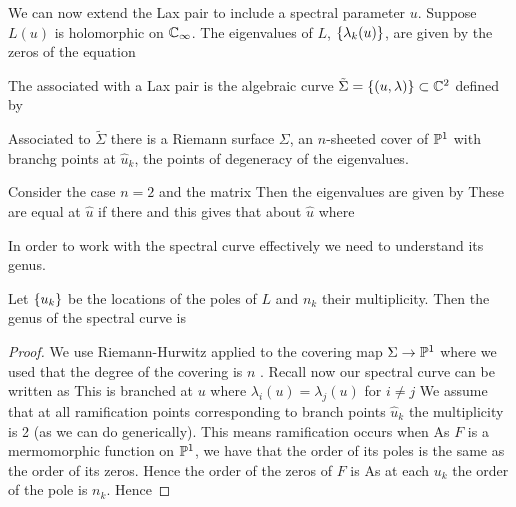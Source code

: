 \documentclass{article}
\begin{document}
We can now extend the Lax pair to include a spectral parameter $u$. Suppose $L(u)$ is holomorphic on $\mathbb{C}_\infty$. The eigenvalues of $L$, $\left\{ \lambda_k(u) \right\}$, are given by the zeros of the equation 

\begin{definition}
	The  associated with a Lax pair is the algebraic curve $\tilde{\Sigma}=\left\{ (u,\lambda) \right\} \subset \mathbb{C}^2$ defined by 
\end{definition}

\begin{prop}
Associated to $\tilde{\Sigma}$ there is a Riemann surface $\Sigma$, an $n$-sheeted cover of $\mathbb{P}^1$ with branchg points at $\hat{u}_k$, the points of degeneracy of the eigenvalues.
\end{prop}

\begin{example}
Consider the case $n=2$ and the matrix 
Then the eigenvalues are given by 
These are equal at $\hat{u}$ if there 
and this gives that about $\hat{u}$
where 
\end{example}

In order to work with the spectral curve effectively we need to understand its genus.
\begin{prop}
	Let $\left\{ u_k \right\}$ be the locations of the poles of $L$ and $n_k$ their multiplicity. Then the genus of the spectral curve is  
\end{prop}
\begin{proof}
 We use Riemann-Hurwitz applied to the covering map $\Sigma \to \mathbb{P}^1$
where we used that the degree of the covering is $n$ . Recall now our spectral curve can be written as 
This is branched at $u$ where $\lambda_i(u) = \lambda_j(u)$ for $i \neq j$ We assume that at all ramification points corresponding to branch points $\hat{u}_k$ the multiplicity is 2 (as we can do generically). This means ramification occurs when 
As $F$ is a mermomorphic function on $\mathbb{P}^1$, we have that the order of its poles is the same as the order of its zeros. Hence the order of the zeros of $F$ is 
As at each $u_k$ the order of the pole is $n_k$. Hence 
\end{proof}
\end{document}
